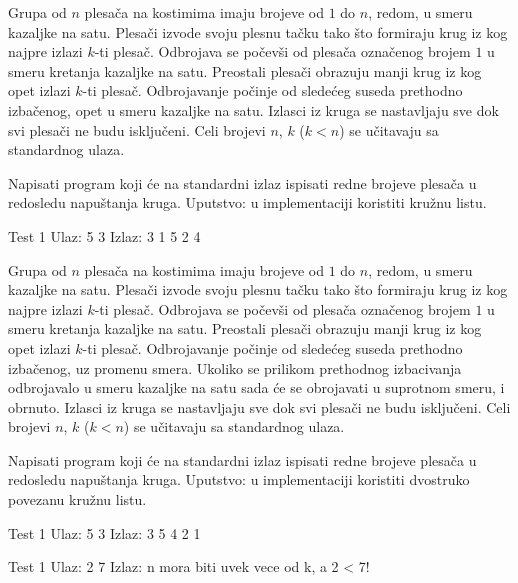 \begin{Exercise}[label=613]
Grupa od $n$ plesača na kostimima imaju brojeve od $1$ do $n$, redom, u smeru kazaljke na satu.
Plesači izvode svoju plesnu tačku tako što formiraju krug iz kog najpre izlazi $k$-ti plesač.
Odbrojava se počevši od plesača označenog brojem $1$ u smeru kretanja kazaljke na satu. 
Preostali plesači obrazuju manji krug iz kog opet izlazi $k$-ti plesač. Odbrojavanje počinje od
sledećeg suseda prethodno izbačenog, opet u smeru kazaljke na satu. Izlasci iz kruga se nastavljaju
sve dok svi plesači ne budu isključeni. 
Celi brojevi $n$, $k$ ($k < n$) se učitavaju sa standardnog ulaza. 

Napisati program koji će na standardni izlaz ispisati redne brojeve plesača u redosledu napuštanja kruga. 
Uputstvo: u implementaciji koristiti kružnu listu.
\begin{maxitest}
  \begin{test}{Test 1}
Ulaz: 5 3 
Izlaz: 3 1 5 2 4
  \end{test}
\end{maxitest}

\end{Exercise}
\begin{Answer}[ref=613]
\end{Answer}

\begin{Exercise}[label=614]
Grupa od $n$ plesača na kostimima imaju brojeve od $1$ do $n$, redom, u smeru kazaljke na satu.
Plesači izvode svoju plesnu tačku tako što formiraju krug iz kog najpre izlazi $k$-ti plesač.
Odbrojava se počevši od plesača označenog brojem $1$ u smeru kretanja kazaljke na satu. 
Preostali plesači obrazuju manji krug iz kog opet izlazi $k$-ti plesač. Odbrojavanje počinje od
sledećeg suseda prethodno izbačenog, uz promenu smera. Ukoliko se prilikom prethodnog izbacivanja odbrojavalo 
u smeru kazaljke na satu sada će se obrojavati u suprotnom smeru, i obrnuto. Izlasci iz kruga se nastavljaju
sve dok svi plesači ne budu isključeni. 
Celi brojevi $n$, $k$ ($k < n$) se učitavaju sa standardnog ulaza. 

Napisati program koji će na standardni izlaz ispisati redne brojeve plesača u redosledu napuštanja kruga. 
Uputstvo: u implementaciji koristiti dvostruko povezanu kružnu listu.

\begin{minitest}
  \begin{test}{Test 1}
Ulaz: 5 3 
Izlaz: 3 5 4 2 1
  \end{test}
\end{minitest}

\begin{minitest}
  \begin{test}{Test 1}
Ulaz: 2 7 
Izlaz: n mora biti uvek vece od k, a 2 < 7!
  \end{test}
\end{minitest}

\end{Exercise}
\begin{Answer}[ref=614]
\end{Answer}

